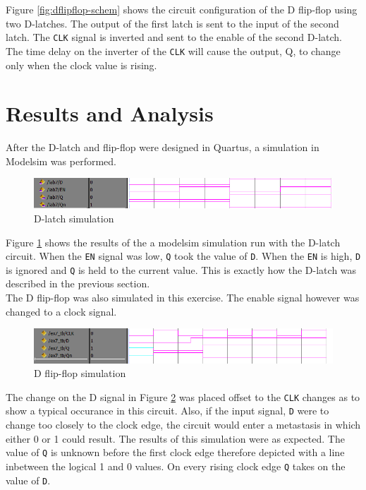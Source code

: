 \documentclass[CMPE]{KGCOEReport}
\begin{document}
Figure \ref{fig:dflipflop-schem} shows the circuit configuration of the D flip-flop using two D-latches. The output of the first latch is sent to the input of the second latch. The \texttt{CLK} signal is inverted and sent to the enable of the second D-latch. The time delay on the inverter of the \texttt{CLK} will cause the output, Q, to change only when the clock value is rising.

\section*{Results and Analysis}

After the D-latch and flip-flop were designed in Quartus, a simulation in Modelsim was performed.

\begin{figure}[h!]
	\centering
	\includegraphics[width=\textwidth]{part1}
	\caption{D-latch simulation}
	\label{fig:dlatch-sim}
\end{figure}

Figure \ref{fig:dlatch-sim} shows the results of the a modelsim simulation run with the D-latch circuit. When the \texttt{EN} signal was low, \texttt{Q} took the value of \texttt{D}. When the \texttt{EN} is high, \texttt{D} is ignored and \texttt{Q} is held to the current value. This is exactly how the D-latch was described in the previous section.\\

The D flip-flop was also simulated in this exercise. The enable signal however was changed to a clock signal.\pagebreak

\begin{figure}[h!]
	\centering
	\includegraphics[width=\textwidth]{part2}
	\caption{D flip-flop simulation}
	\label{fig:dflipflop-sim}
\end{figure}

The change on the D signal in Figure \ref{fig:dflipflop-sim} was placed offset to the \texttt{CLK} changes as to show a typical occurance in this circuit. Also, if the input signal, \texttt{D} were to change too closely to the clock edge, the circuit would enter a metastasis in which either 0 or 1 could result. The results of this simulation were as expected. The value of \texttt{Q} is unknown before the first clock edge therefore depicted with a line inbetween the logical 1 and 0 values. On every rising clock edge \texttt{Q} takes on the value of \texttt{D}.
\end{document}
